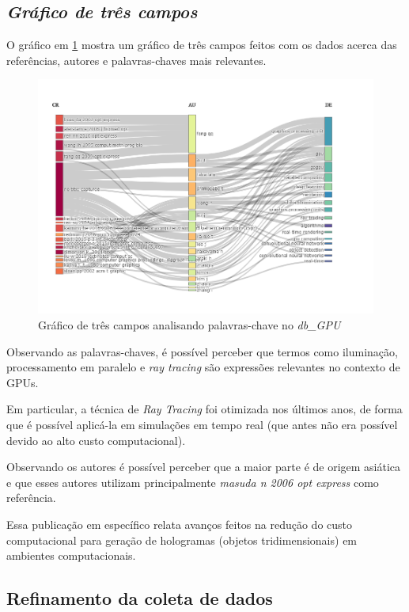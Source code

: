 \subsection{\textit{Gráfico de três campos}}

O gráfico em \ref{fig:gpu-three-field} mostra um gráfico de três campos feitos com os dados acerca das referências, autores e palavras-chaves mais relevantes.

\begin{figure}[ht]
    \centering
    \includegraphics[width=12cm]{experiments/gustavo-tomas/AnaliseBibliometrica/GPUs/Graficos/gpu-three-field.png}
    \caption{Gráfico de três campos analisando palavras-chave no \textit{db\_GPU}}
    \label{fig:gpu-three-field}
\end{figure}

Observando as palavras-chaves, é possível perceber que termos como iluminação, processamento em paralelo e \textit{ray tracing} são expressões relevantes no contexto de GPUs.

Em particular, a técnica de \textit{Ray Tracing} foi otimizada nos últimos anos, de forma que é possível aplicá-la em simulações em tempo real (que antes não era possível devido ao alto custo computacional).

Observando os autores é possível perceber que a maior parte é de origem asiática e que esses autores utilizam principalmente \textit{masuda n 2006 opt express} como referência.

Essa publicação em específico relata avanços feitos na redução do custo computacional para geração de hologramas (objetos tridimensionais) em ambientes computacionais.

\subsection{Refinamento da coleta de dados}

